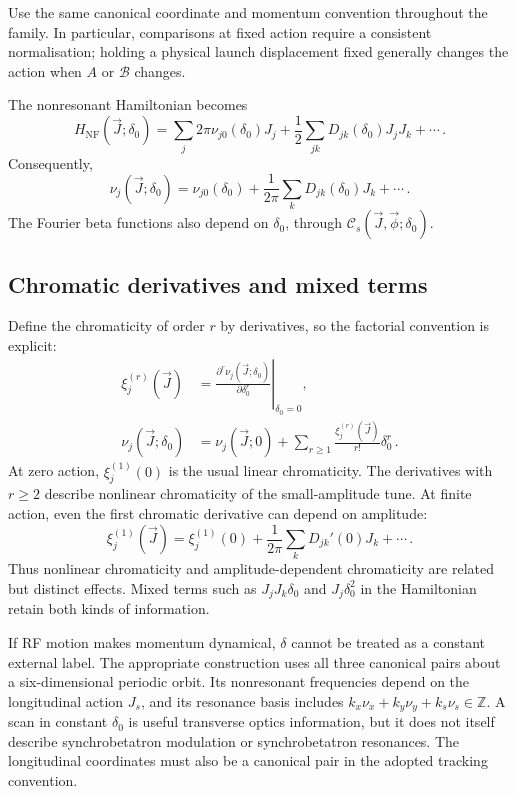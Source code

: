 Use the same canonical coordinate and momentum convention throughout the
family.  In particular, comparisons at fixed action require a consistent
normalisation; holding a physical launch displacement fixed generally
changes the action when $A$ or $\mathcal B$ changes.

The nonresonant Hamiltonian becomes
\begin{equation}\label{eq:nnf-chromatic-hamiltonian}
    H_{\mathrm{NF}}(\vec J;\delta_0) = \sum_j2\pi \nu_{j0}(\delta_0)J_j + \frac12\sum_{jk}D_{jk}(\delta_0)J_jJ_k + \cdots\,.
\end{equation}
Consequently,
\begin{equation}\label{eq:nnf-amplitude-chromatic-tune}
    \nu_j(\vec J;\delta_0) = \nu_{j0}(\delta_0) + \frac{1}{2\pi}\sum_kD_{jk}(\delta_0)J_k + \cdots\,.
\end{equation}
The Fourier beta functions also depend on $\delta_0$, through
$\mathcal C_s(\vec J,\vec\phi;\delta_0)$.


\subsection{Chromatic derivatives and mixed terms}

Define the chromaticity of order $r$ by derivatives, so the factorial
convention is explicit:
\begin{align}\label{eq:nnf-chromaticity-definition}
    \xi_j^{(r)}(\vec J)
    & = \left.\frac{\partial^r \nu_j(\vec J;\delta_0)}
    {\partial\delta_0^r}\right|_{\delta_0 = 0},\\
    \nu_j(\vec J;\delta_0)
    & = \nu_j(\vec J;0) + \sum_{r\ge1}
    \frac{\xi_j^{(r)}(\vec J)}{r!}\delta_0^r\,.
\end{align}
At zero action, $\xi_j^{(1)}(0)$ is the usual linear chromaticity.
The derivatives with $r\ge2$ describe nonlinear chromaticity of the
small-amplitude tune.  At finite action, even the first chromatic
derivative can depend on amplitude:
\begin{equation}
    \xi_j^{(1)}(\vec J) = \xi_j^{(1)}(0) + \frac{1}{2\pi}\sum_kD_{jk}'(0)J_k + \cdots\,.
\end{equation}
Thus nonlinear chromaticity and amplitude-dependent chromaticity are
related but distinct effects.  Mixed terms such as $J_jJ_k\delta_0$ and
$J_j\delta_0^2$ in the Hamiltonian retain both kinds of information.

If RF motion makes momentum dynamical, $\delta$ cannot be treated as a
constant external label.  The appropriate construction uses all three
canonical pairs about a six-dimensional periodic orbit.  Its nonresonant
frequencies depend on the longitudinal action $J_s$, and its resonance
basis includes $k_x\nu_x + k_y\nu_y + k_s\nu_s\in\mathbb Z$.  A scan in constant
$\delta_0$ is useful transverse optics information, but it does not itself
describe synchrobetatron modulation or synchrobetatron resonances.  The
longitudinal coordinates must also be a canonical pair in the adopted
tracking convention.



